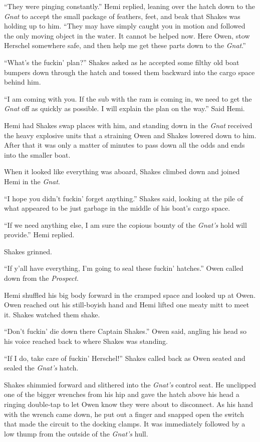 \documentclass[
]{scrbook}
\begin{document}
``They were pinging constantly.'' Hemi replied, leaning over the hatch
down to the \emph{Gnat} to accept the small package of feathers, feet,
and beak that Shakes was holding up to him. ``They may have simply
caught you in motion and followed the only moving object in the water.
It cannot be helped now. Here Owen, stow Herschel somewhere safe, and
then help me get these parts down to the \emph{Gnat}.''

``What's the fuckin' plan?'' Shakes asked as he accepted some filthy old
boat bumpers down through the hatch and tossed them backward into the
cargo space behind him.

``I am coming with you. If the sub with the ram is coming in, we need to
get the \emph{Gnat} off as quickly as possible. I will explain the plan
on the way.'' Said Hemi.

Hemi had Shakes swap places with him, and standing down in the
\emph{Gnat} received the heavy explosive units that a straining Owen and
Shakes lowered down to him. After that it was only a matter of minutes
to pass down all the odds and ends into the smaller boat.

When it looked like everything was aboard, Shakes climbed down and
joined Hemi in the \emph{Gnat}.

``I hope you didn't fuckin' forget anything.'' Shakes said, looking at
the pile of what appeared to be just garbage in the middle of his boat's
cargo space.

``If we need anything else, I am sure the copious bounty of the
\emph{Gnat's} hold will provide.'' Hemi replied.

Shakes grinned.

``If y'all have everything, I'm going to seal these fuckin' hatches.''
Owen called down from the \emph{Prospect}.

Hemi shuffled his big body forward in the cramped space and looked up at
Owen. Owen reached out his still-boyish hand and Hemi lifted one meaty
mitt to meet it. Shakes watched them shake.

``Don't fuckin' die down there Captain Shakes.'' Owen said, angling his
head so his voice reached back to where Shakes was standing.

``If I do, take care of fuckin' Herschel!'' Shakes called back as Owen
seated and sealed the \emph{Gnat's} hatch.

Shakes shimmied forward and slithered into the \emph{Gnat's} control
seat. He unclipped one of the bigger wrenches from his hip and gave the
hatch above his head a ringing double-tap to let Owen know they were
about to disconnect. As his hand with the wrench came down, he put out a
finger and snapped open the switch that made the circuit to the docking
clamps. It was immediately followed by a low thump from the outside of
the \emph{Gnat's} hull.
\end{document}
